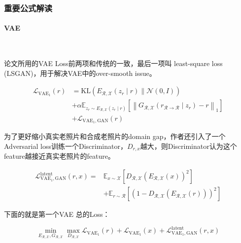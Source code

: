 \documentclass[10pt]{article}
\begin{document}
\subsubsection{重要公式解读}

\paragraph{VAE}~{}
\newline

论文所用的VAE Loss前两项和传统的一致，最后一项叫 least-square loss
(LSGAN)\cite{mao2017squares}，用于解决VAE中的over-smooth issue。

\begin{equation}
\begin{aligned}
\mathcal{L}_{\mathrm{VAE}_{1}}(r) &=\mathrm{KL}\left(E_{\mathcal{R}, \mathcal{X}}\left(z_{r} \mid r\right) \| \mathcal{N}(0, I)\right) \\
&+\alpha \mathbb{E}_{z_{r} \sim E_{\mathcal{R}, \mathcal{X}}\left(z_{r} \mid r\right)}\left[\left\|G_{\mathcal{R}, \mathcal{X}}\left(r_{\mathcal{R} \rightarrow \mathcal{R}} \mid z_{r}\right)-r\right\|_{1}\right] \\
&+\mathcal{L}_{\mathrm{VAE}_{1}, \mathrm{GAN}}(r)
\end{aligned}
\end{equation}

为了更好缩小真实老照片和合成老照片的domain
gap，作者还引入了一个Adversarial
loss训练一个Discriminator，\(D_{r,x}\)越大，则Discriminator认为这个feature越接近真实老照片的feature。

\begin{equation}
\begin{aligned}
\mathcal{L}_{\mathrm{VAE}_{1}, \mathrm{GAN}}^{\text {latent }}(r, x)=& \mathbb{E}_{x \sim \mathcal{X}}\left[D_{\mathcal{R}, \mathcal{X}}\left(E_{\mathcal{R}, \mathcal{X}}(x)\right)^{2}\right] \\
&+\mathbb{E}_{r \sim \mathcal{R}}\left[\left(1-D_{\mathcal{R}, \mathcal{X}}\left(E_{\mathcal{R}, \mathcal{X}}(r)\right)\right)^{2}\right]
\end{aligned}
\end{equation}

下面的就是第一个VAE 总的Loss：

\[\min _{E_{\mathcal{R}, \mathcal{X}}, G_{\mathcal{R}, \mathcal{X}}} \max _{D_{\mathcal{R}, \mathcal{X}}} \mathcal{L}_{\mathrm{VAE}_{1}}(r)+\mathcal{L}_{\mathrm{VAE}_{1}}(x)+\mathcal{L}_{\mathrm{VAE}_{1}, \mathrm{GAN}}^{\text {latent }}(r, x)\]
\end{document}
